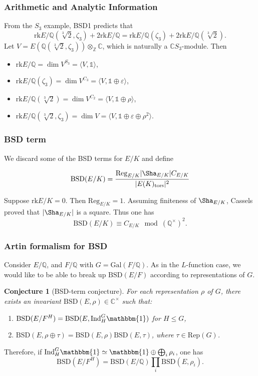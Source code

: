 \documentclass{beamer}
\newcommand{\Gal}{\mathrm{Gal}}
\newcommand{\BSD}{\mathrm{BSD}}
\newcommand{\tors}{\mathrm{tors}}
\newcommand{\Reg}{\mathrm{Reg}}
\newcommand{\rk}{\mathrm{rk}}
\newcommand{\trivial}{\mathbbm{1}}
\newcommand{\Ind}{\mathrm{Ind}}
\newcommand{\Rep}{\mathrm{Rep}}
\newcommand{\CC}{\mathbb{C}}
\newcommand{\QQ}{\mathbb{Q}}
\newcommand{\ZZ}{\mathbb{Z}}
\theoremstyle{plain}
\newtheorem{conjecture}[thm]{Conjecture}
\begin{document}
\begin{frame}
    \frametitle{Arithmetic and Analytic Information}
    \begin{example}
        From the $S_3$ example, BSD1 predicts that $$\rk E/\QQ(\sqrt[3]{2},\zeta_3)+2\rk E/\QQ=\rk E/\QQ(\zeta_3)+2\rk E/\QQ(\sqrt[3]{2}).$$
        Let $V=E(\QQ(\sqrt[3]{2},\zeta_3))\otimes_\ZZ \CC$, which is naturally a $\CC S_3$-module. Then
        \begin{itemize}
            \item $\rk E/\QQ=\dim V^{S_3}= \langle V,\mathds{1}\rangle$,
            \item $\rk E/\QQ(\zeta_3)=\dim V^{C_3}=\langle V,\mathds{1}\oplus\varepsilon\rangle$,
            \item $\rk E/\QQ(\sqrt[3]{2})=\dim V^{C_2}=\langle V,\mathds{1}\oplus\rho\rangle$,
            \item $\rk E/\QQ(\sqrt[3]{2},\zeta_3)=\dim V=\langle V,\mathds{1}\oplus\varepsilon\oplus\rho^2\rangle$.
        \end{itemize}
    \end{example}

\end{frame}

\begin{frame}
    \frametitle{BSD term}
    We discard some of the BSD terms for $E / K$
    and define  

    \begin{definition}
        $$\BSD(E / K) = \frac{\Reg_{E / K}|\Sha_{E / K}| C_{E / K}}{|E(K)_{\tors}|^2 }$$
    \end{definition}
    \pause

    Suppose $\rk E / K = 0$. Then $\Reg_{E / K} = 1$. Assuming finiteness of $\Sha_{E / K}$, Cassels proved that $|\Sha_{E / K}|$ is a square. \pause Thus one has
    $$ \BSD(E / K) \equiv C_{E / K} \mod (\QQ^{\times})^2. $$
\end{frame}

\begin{frame}
    \frametitle{Artin formalism for BSD}
    Consider $E / \QQ$, and $F / \QQ$ with $G = \Gal(F / \QQ)$.  \pause
    As in the $L$-function case, we would like to be able to break up $\BSD(E / F)$ according to representations of $G$. \pause
    
    \begin{conjecture}[BSD-term conjecture]
        For each representation $\rho$ of $G$, there exists an invariant $\BSD(E, \rho) \in \CC^{\times}$ such that:\pause
        \begin{enumerate}
            \item$\BSD(E / F^H) = \BSD(E, \Ind_H^G \trivial)$ for $H \leq G$, \pause
            \item $\BSD(E, \rho \oplus \tau) = \BSD(E, \rho)\BSD(E , \tau)$, where $\tau \in \Rep(G)$.\pause
        \end{enumerate}
    \end{conjecture}

    Therefore, if $\Ind_H^G \trivial \simeq \trivial \oplus \bigoplus_i \rho_i$, one has
    $$ \BSD(E / F^H) = \BSD(E / \QQ)\prod_i \BSD(E, \rho_i). $$ 
\end{frame}
\end{document}
